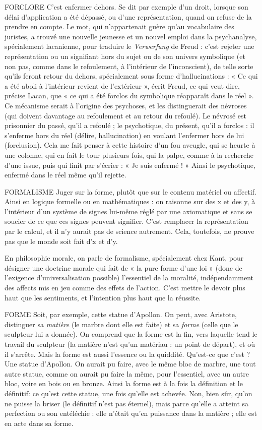 FORCLORE C’est enfermer dehors. Se dit par exemple d’un droit, lorsque
son délai d'application a été dépassé, ou d’une représentation,
quand on refuse de la prendre en compte. Le mot, qui n’appartenait guère qu’au
vocabulaire des juristes, a trouvé une nouvelle jeunesse et un nouvel emploi dans
la psychanalyse, spécialement lacanienne, pour traduire le {\it Verwerfung} de Freud :
c'est rejeter une représentation ou un signifiant hors du sujet ou de son univers
symbolique (et non pas, comme dans le refoulement, à l’intérieur de l’inconscient),
de telle sorte qu’ils feront retour du dehors, spécialement sous forme
d’hallucinations : « Ce qui a été aboli à l’intérieur revient de l'extérieur », écrit
Freud, ce qui veut dire, précise Lacan, que « ce qui a été forclos du symbolique
réapparaît dans le réel ». Ce mécanisme serait à l’origine des psychoses, et les distinguerait
des névroses (qui doivent davantage au refoulement et au retour du
refoulé). Le névrosé est prisonnier du passé, qu’il a refoulé ; le psychotique, du
présent, qu'il a forclos : il s’enferme hors du réel (délire, hallucination) en voulant
l’enfermer hors de lui (forclusion). Cela me fait penser à cette histoire d’un fou
aveugle, qui se heurte à une colonne, qui en fait le tour plusieurs fois, qui la
palpe, comme à la recherche d’une issue, puis qui finit par s’écrier : « Je suis
enfermé ! » Ainsi le psychotique, enfermé dans le réel même qu’il rejette.

FORMALISME  Juger sur la forme, plutôt que sur le contenu matériel ou
affectif. Ainsi en logique formelle ou en mathématiques :
on raisonne sur des x et des y, à l’intérieur d’un système de signes lui-même
réglé par une axiomatique et sans se soucier de ce que ces signes peuvent signifier.
C’est remplacer la représentation par le calcul, et il n’y aurait pas de
science autrement. Cela, toutefois, ne prouve pas que le monde soit fait d’x et
d'y.

En philosophie morale, on parle de formalisme, spécialement chez Kant,
pour désigner une doctrine morale qui fait de « la pure forme d’une loi » (donc
de l’exigence d’universalisation possible) l'essentiel de la moralité, indépendamment
des affects mis en jeu comme des effets de l’action. C’est mettre le devoir
plus haut que les sentiments, et l’intention plus haut que la réussite.

FORME Soit, par exemple, cette statue d’Apollon. On peut, avec Aristote,
distinguer sa {\it matière} (le marbre dont elle est faite) et sa {\it forme} (celle
que le sculpteur lui a donnée). On comprend que la forme est la fin, vers
laquelle tend le travail du sculpteur (la matière n’est qu’un matériau : un point
de départ), et où il s’arrête. Mais la forme est aussi l’essence ou la quiddité.
Qu'est-ce que c’est ? Une statue d’Apollon. On aurait pu faire, avec le même
bloc de marbre, une tout autre statue, comme on aurait pu faire la même, pour
l'essentiel, avec un autre bloc, voire en bois ou en bronze. Ainsi la forme est à
la fois la définition et le définitif: ce qu’est cette statue, une fois qu’elle est
achevée. Non, bien sûr, qu’on ne puisse la briser (le définitif n’est pas éternel),
mais parce qu’elle a atteint sa perfection ou son entéléchie : elle n’était qu’en
puissance dans la matière ; elle est en acte dans sa forme.

